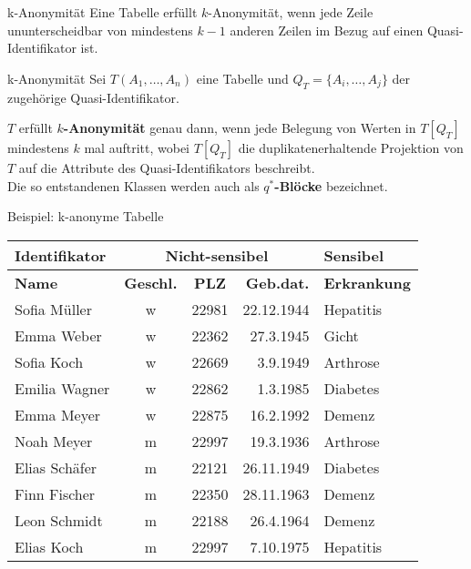 \begin{frame}{k-Anonymität}
	Eine Tabelle erfüllt \(k\)-Anonymität, wenn jede Zeile ununterscheidbar von mindestens \(k-1\) anderen Zeilen im Bezug auf einen Quasi-Identifikator ist.

	\vspace{0.5cm}

	\begin{block}{k-Anonymität} Sei \(T(A_1, \dots , A_n)\) eine Tabelle und \(Q_T=\{A_i, \dots, A_j\}\) der zugehörige Quasi-Identifikator.
	\vspace{0.1cm}

	\(T\) erfüllt \textbf{\(k\)-Anonymität} genau dann, wenn jede Belegung von Werten in \(T[Q_T]\) mindestens \(k\) mal auftritt, wobei \(T[Q_T]\) die duplikatenerhaltende Projektion von \(T\) auf die Attribute des Quasi-Identifikators beschreibt.\\
	Die so entstandenen Klassen werden auch als \textbf{\(q^*\)-Blöcke} bezeichnet.
	\end{block}

\end{frame}

\begin{frame}{Beispiel: k-anonyme Tabelle}
	\begin{center}
		\begin{tabular}{|l|c|c|r|l|}
		\hline \textbf{Identifikator} & \multicolumn{3}{c|}{\textbf{Nicht-sensibel}} & \textbf{Sensibel} \\ 
		\hline \textbf{Name} & \textbf{Geschl.} & \textbf{PLZ} & \textbf{Geb.dat.} & \textbf{Erkrankung} \\
		\hline \hline Sofia Müller & w & 22981 & 22.12.1944 & Hepatitis \\ 
		\hline Emma Weber & w & 22362 & 27.3.1945 & Gicht \\
		\hline Sofia Koch & w & 22669 & 3.9.1949 & Arthrose \\ 
		\hline Emilia Wagner & w & 22862 & 1.3.1985 & Diabetes \\ 
		\hline Emma Meyer & w & 22875 & 16.2.1992 & Demenz \\  
		\hline Noah Meyer & m & 22997 & 19.3.1936 & Arthrose \\ 
		\hline Elias Schäfer & m & 22121 & 26.11.1949 & Diabetes \\ 
		\hline Finn Fischer & m & 22350 & 28.11.1963 & Demenz \\ 
		\hline Leon Schmidt & m & 22188 & 26.4.1964 & Demenz \\ 
		\hline Elias Koch & m & 22997 & 7.10.1975 & Hepatitis \\ 
		\hline 
		\end{tabular}
	\end{center}
\end{frame}

